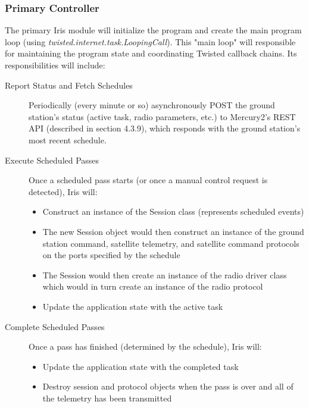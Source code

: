\documentclass{mxl-note}
\begin{document}
\subsubsection{Primary Controller}
The primary Iris module will initialize the program and create the main program loop (using \textit{twisted.internet.task.LoopingCall}). This "main loop" will responsible for maintaining the program state and coordinating Twisted callback chains. Its responsibilities will include: 
\begin{description}
	\item [Report Status and Fetch Schedules] Periodically (every minute or so) asynchronously POST the ground station's status (active task, radio parameters, etc.) to Mercury2's REST API (described in section 4.3.9), which responds with the ground station's most recent schedule. 
	\item [Execute Scheduled Passes] Once a scheduled pass starts (or once a manual control request is detected), Iris will:
		\begin{itemize}
			\item Construct an instance of the Session class (represents scheduled events)
			\item The new Session object would then construct an instance of the ground station command, satellite telemetry, and satellite command protocols on the ports specified by the schedule
			\item The Session would then create an instance of the radio driver class which would in turn create an instance of the radio protocol
			\item Update the application state with the active task
		\end{itemize}
	\item [Complete Scheduled Passes] Once a pass has finished (determined by the schedule), Iris will:
		\begin{itemize}
			\item Update the application state with the completed task
			\item Destroy session and protocol objects when the pass is over and all of the telemetry has been transmitted
		\end{itemize}
\end{description}
\end{document}
